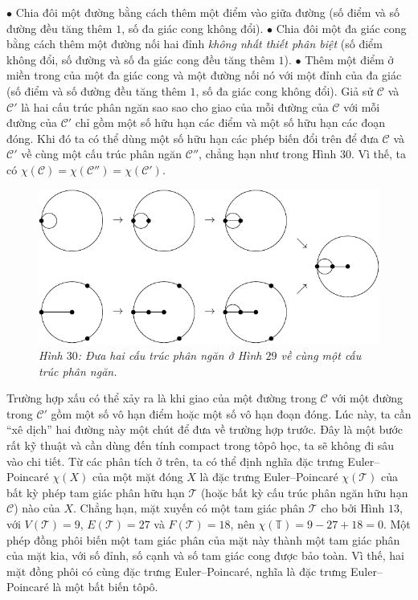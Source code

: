 \begin{multicols}{2}
	\vskip 0.1cm
	$\bullet$ Chia đôi một đường bằng cách thêm một điểm vào giữa đường (số điểm và số đường đều tăng thêm $1$, số đa giác cong không đổi).
	\vskip 0.1cm	
	$\bullet$ Chia đôi một đa giác cong bằng cách thêm một đường nối hai đỉnh {\it không nhất thiết phân biệt} (số điểm không đổi, số đường và số đa giác cong đều tăng thêm $1$).
	\vskip 0.1cm	
	$\bullet$ Thêm một điểm ở miền trong của một đa giác cong và một đường nối nó với một đỉnh của đa giác (số điểm và số đường đều tăng thêm $1$, số đa giác cong không đổi).
	\vskip 0.1cm
	Giả sử $\mathscr{C}$ và $\mathscr{C}'$ là hai cấu trúc phân ngăn sao sao cho giao của mỗi đường của $\mathscr{C}$ với mỗi đường của $\mathscr{C}'$ chỉ gồm một số hữu hạn các điểm và một số hữu hạn các đoạn đóng. Khi đó ta có thể dùng một số hữu hạn các phép biến đổi trên để đưa $\mathscr{C}$ và $\mathscr{C}'$ về cùng một cấu trúc phân ngăn $\mathscr{C}''$, chẳng hạn như trong Hình $30$. Vì thế, ta có $\chi(\mathscr{C}) = \chi(\mathscr{C}'') = \chi(\mathscr{C}')$.
	\begin{figure}[H]
		\vspace*{-5pt}
		\centering\captionsetup{labelformat=empty, justification=centering}
		\includegraphics[width=1\linewidth]{H30.pdf}
		\caption{\small\textit{\color{duongvaotoanhoc}Hình $30$: Đưa hai cấu trúc phân ngăn ở Hình $29$ về cùng một cấu trúc phân ngăn.}}
		\vspace*{-10pt}
	\end{figure}
	Trường hợp xấu có thể xảy ra là khi giao của một đường trong $\mathscr{C}$ với một đường trong $\mathscr{C}'$ gồm một số vô hạn điểm hoặc một số vô hạn đoạn đóng. Lúc này, ta cần ``xê dịch'' hai đường này một chút để đưa về trường hợp trước. Đây là một bước rất kỹ thuật và cần dùng đến tính compact trong tôpô học, ta sẽ không đi sâu vào chi tiết.
	\vskip 0.1cm
	Từ các phân tích ở trên, ta có thể định nghĩa đặc trưng Euler--Poincar\'e $\chi(X)$ của một mặt đóng $X$ là đặc trưng Euler--Poincar\'e $\chi(\mathscr{T})$ của bất kỳ phép tam giác phân hữu hạn $\mathscr{T}$ (hoặc bất kỳ cấu trúc phân ngăn hữu hạn $\mathscr{C}$) nào của $X$. Chẳng hạn, mặt xuyến có một tam giác phân $\mathscr{T}$ cho bởi Hình $13$, với $V(\mathscr{T}) = 9$, $E(\mathscr{T}) = 27$ và $F(\mathscr{T}) = 18$, nên $\chi(\mathbb{T}) = 9 - 27 + 18 = 0$. Một phép đồng phôi biến một tam giác phân của mặt này thành một tam giác phân của mặt kia, với số đỉnh, số cạnh và số tam giác cong được bảo toàn. Vì thế, hai mặt đồng phôi có cùng đặc trưng Euler--Poincar\'e, nghĩa là đặc trưng Euler--Poincar\'e là một bất biến tôpô.

\end{multicols}
